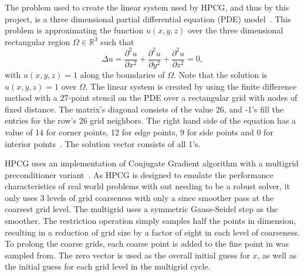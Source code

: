 The problem used to create the linear system used by HPCG, and thus by this project, is a three dimensional partial differential equation (PDE) model~\cite{Dongarra:2015:HPCG}.
This problem is approximating the function \(u(x, y, z)\) over the three dimensional rectangular region \(\Omega\in\mathbb{R}^3\) such that
\[
	\Delta u = \frac{\partial^2 u}{\partial x^2} + \frac{\partial^2 u}{\partial y^2} + \frac{\partial^2 u}{\partial z^2} = 0,
\] with \(u(x, y, z) = 1\) along the boundaries of \(\Omega\).
Note that the solution is \(u(x, y, z) = 1\) over \(\Omega\).
The linear system is created by using the finite difference method with a 27-point stencil on the PDE over a rectangular grid with nodes of fixed distance.
The matrix's diagonal consists of the value 26, and -1's fill the entries for the row's 26 grid neighbors.
The right hand side of the equation has a value of 14 for corner points, 12 for edge points, 9 for side points and 0 for interior points~\cite{Kincaid:2009:Numerical}.
The solution vector consists of all 1's.

HPCG uses an implementation of Conjugate Gradient algorithm with a multigrid preconditioner variant~\cite{Dongarra:2015:HPCG}.
As HPCG is designed to emulate the performance characteristics of real world problems with out needing to be a robust solver, it only uses 3 levels of grid coarseness with only a since smoother pass at the coarsest grid level.
The multigrid uses a symmetric Gauss-Seidel step as the smoother.
The restriction operation simply samples half the points in dimension, resulting in a reduction of grid size by a factor of eight in each level of coarseness.
To prolong the coarse grids, each coarse point is added to the fine point in was sampled from.
The zero vector is used as the overall initial guess for \(x\), as well as the initial guess for each grid level in the multigrid cycle.

